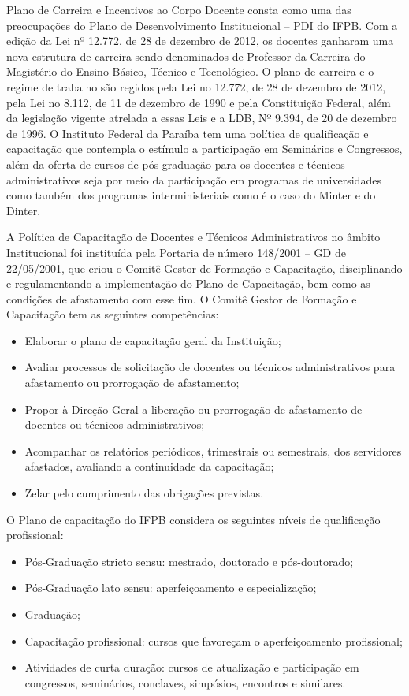 Plano de Carreira e Incentivos ao Corpo Docente consta como uma das preocupações do Plano de Desenvolvimento Institucional – PDI do IFPB. Com a edição da Lei nº 12.772, de 28 de dezembro de 2012, os docentes ganharam uma nova estrutura de carreira sendo denominados de Professor da Carreira do Magistério do Ensino Básico, Técnico e Tecnológico. O plano de carreira e o regime de trabalho são regidos pela Lei no 12.772, de 28 de dezembro de 2012, pela Lei no 8.112, de 11 de dezembro de 1990 e pela Constituição Federal, além da legislação vigente atrelada a essas Leis e a LDB, Nº 9.394, de 20 de dezembro de 1996. O Instituto Federal da Paraíba tem uma política de qualificação e capacitação que contempla o estímulo a participação em Seminários e Congressos, além da oferta de cursos de pós-graduação para os docentes e técnicos administrativos seja por meio da participação em programas de universidades como também dos programas interministeriais como é o caso do Minter e do Dinter.

A Política de Capacitação de Docentes e Técnicos Administrativos no âmbito Institucional foi instituída pela Portaria de n\'umero 148/2001 – GD de 22/05/2001, que criou o Comitê Gestor de Formação e Capacitação, disciplinando e regulamentando a implementação do Plano de Capacitação, bem como as condições de afastamento com esse fim. O Comitê Gestor de Formação e Capacitação tem as seguintes competências:

\begin{itemize}
\item Elaborar o plano de capacitação geral da Instituição;
\item Avaliar processos de solicitação de docentes ou técnicos administrativos para afastamento ou prorrogação de afastamento;
\item Propor à Direção Geral a liberação ou prorrogação de afastamento de docentes ou técnicos-administrativos;
\item Acompanhar os relatórios periódicos, trimestrais ou semestrais, dos servidores afastados, avaliando a continuidade da capacitação;
\item Zelar pelo cumprimento das obrigações previstas.
\end{itemize}

O Plano de capacitação do IFPB considera os seguintes níveis de qualificação profissional:
\begin{itemize}
\item Pós-Graduação stricto sensu: mestrado, doutorado e pós-doutorado;
\item Pós-Graduação lato sensu: aperfeiçoamento e especialização;
\item Graduação;
\item Capacitação profissional: cursos que favoreçam o aperfeiçoamento profissional;
\item Atividades de curta duração: cursos de atualização e participação em congressos, seminários, conclaves, simpósios, encontros e similares.
\end{itemize}

